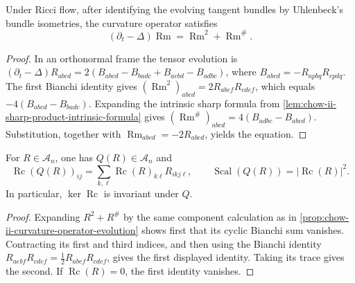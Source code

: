 \begin{proposition}
  \label{prop:chow-ii-curvature-operator-evolution}
  Under Ricci flow, after identifying the evolving tangent bundles by
  Uhlenbeck's bundle isometries, the curvature operator satisfies
  \[
    (\partial_t-\Delta)\operatorname{Rm}
       =\operatorname{Rm}^2+\operatorname{Rm}^\#.
  \]
\end{proposition}
\begin{proof}
\sketch
  In an orthonormal frame the tensor evolution is
  \((\partial_t-\Delta)R_{abcd}
  =2(B_{abcd}-B_{badc}+B_{acbd}-B_{adbc})\), where
  \(B_{abcd}=-R_{apbq}R_{cpdq}\).  The first Bianchi identity gives
  \((\operatorname{Rm}^2)_{abcd}=2R_{abef}R_{cdef}\), which equals
  \(-4(B_{abcd}-B_{badc})\).  Expanding the intrinsic sharp formula from
  \ref{lem:chow-ii-sharp-product-intrinsic-formula} gives
  \((\operatorname{Rm}^\#)_{abcd}=4(B_{adbc}-B_{abcd})\).  Substitution,
  together with \(\operatorname{Rm}_{abcd}=-2R_{abcd}\), yields the equation.
\end{proof}

\begin{corollary}
  \label{cor:chow-ii-curvature-quadratic-trace}
  For \(R\in\mathcal A_n\), one has \(Q(R)\in\mathcal A_n\) and
  \[
    \operatorname{Rc}(Q(R))_{ij}
      =\sum_{k,\ell}\operatorname{Rc}(R)_{k\ell}R_{ikj\ell},
    \qquad
    \operatorname{Scal}(Q(R))=|\operatorname{Rc}(R)|^2.
  \]
  In particular, \(\ker\operatorname{Rc}\) is invariant under \(Q\).
\end{corollary}
\begin{proof}
\sketch
  Expanding \(R^2+R^\#\) by the same component calculation as in
  \ref{prop:chow-ii-curvature-operator-evolution} shows first that its cyclic
  Bianchi sum vanishes.  Contracting its first and third indices, and then
  using the Bianchi identity
  \(R_{aebf}R_{cdef}=\tfrac12R_{abef}R_{cdef}\), gives the first displayed
  identity.  Taking its trace gives the second.  If \(\operatorname{Rc}(R)=0\),
  the first identity vanishes.
\end{proof}

